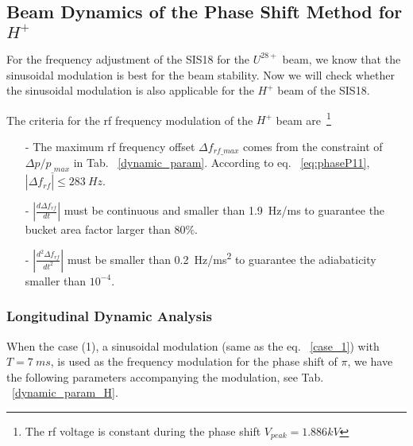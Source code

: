 
\subsection{Beam Dynamics of the Phase Shift Method for $H^+$} 

For the frequency adjustment of the SIS18 for the $U^\mathit{28+}$ beam, we know that the sinusoidal modulation is best for the beam stability. Now we will check whether the sinusoidal modulation is also applicable for the $H^+$ beam of the SIS18.

The criteria for the rf frequency modulation of the $H^+$ beam are~\footnote{The rf voltage is constant during the phase shift $V_{peak}=1.886kV$}
\begin{itemize}
\item[-]
The maximum rf frequency offset $\Delta f_\mathit{rf\_max}$ comes from the constraint of $\Delta p/p_\mathit{\_max}$ in Tab. ~\ref{dynamic_param}. According to eq. ~\ref{eq:phaseP11}, $|\Delta f_\mathit{rf}| \le \SI{283}{Hz}$.
\item[-]
$|\frac{d\Delta f_{\mathit{rf}}}{dt}|$ must be continuous and smaller than \SI{1.9}{Hz/ms} to guarantee the bucket area factor larger than $80\%$. 
\item[-]
$|\frac{d^2\Delta f_{\mathit{rf}}}{dt^2}|$ must be smaller than \SI{0.2}{Hz/ms^2} to guarantee the adiabaticity smaller than $10^{-4}$.
\end{itemize}

	\subsubsection{Longitudinal Dynamic Analysis}
When the case (1), a sinusoidal modulation (same as the eq. ~\ref{case_1}) with $T=\SI{7}{ms}$, is used as the frequency modulation for the phase shift of $\pi$, we have the following parameters accompanying the modulation, see Tab. ~\ref{dynamic_param_H}. 

